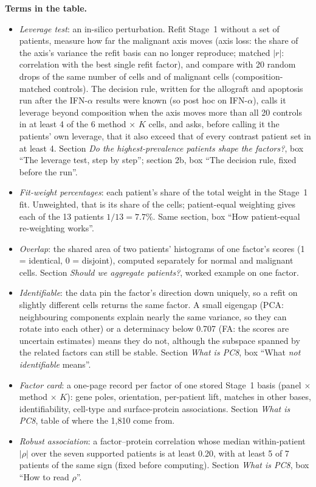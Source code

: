 {\footnotesize
\textbf{Terms in the table.}\par\nobreak
\begin{itemize}[leftmargin=1.6em,itemsep=1pt]
\item[a] \emph{Leverage test}: an in-silico perturbation. Refit Stage~1 without a set of patients, measure how far the malignant axis moves (axis loss: the share of the axis's variance the refit basis can no longer reproduce; matched $|r|$: correlation with the best single refit factor), and compare with 20 random drops of the same number of cells and of malignant cells (composition-matched controls). The decision rule, written for the allograft and apoptosis run after the IFN-$\alpha$ results were known (so post hoc on IFN-$\alpha$), calls it leverage beyond composition when the axis moves more than all 20 controls in at least 4 of the 6 method $\times$ $K$ cells, and asks, before calling it the patients' own leverage, that it also exceed that of every contrast patient set in at least 4. Section \emph{Do the highest-prevalence patients shape the factors?}, box ``The leverage test, step by step''; section 2b, box ``The decision rule, fixed before the run''.
\item[b] \emph{Fit-weight percentages}: each patient's share of the total weight in the Stage~1 fit. Unweighted, that is its share of the cells; patient-equal weighting gives each of the 13 patients $1/13 = 7.7\%$. Same section, box ``How patient-equal re-weighting works''.
\item[c] \emph{Overlap}: the shared area of two patients' histograms of one factor's scores (1 = identical, 0 = disjoint), computed separately for normal and malignant cells. Section \emph{Should we aggregate patients?}, worked example on one factor.
\item[d] \emph{Identifiable}: the data pin the factor's direction down uniquely, so a refit on slightly different cells returns the same factor. A small eigengap (PCA: neighbouring components explain nearly the same variance, so they can rotate into each other) or a determinacy below 0.707 (FA: the scores are uncertain estimates) means they do not, although the subspace spanned by the related factors can still be stable. Section \emph{What is PC8}, box ``What \emph{not identifiable} means''.
\item[e] \emph{Factor card}: a one-page record per factor of one stored Stage~1 basis (panel $\times$ method $\times$ $K$): gene poles, orientation, per-patient lift, matches in other bases, identifiability, cell-type and surface-protein associations. Section \emph{What is PC8}, table of where the 1,810 come from.
\item[f] \emph{Robust association}: a factor--protein correlation whose median within-patient $|\rho|$ over the seven supported patients is at least 0.20, with at least 5 of 7 patients of the same sign (fixed before computing). Section \emph{What is PC8}, box ``How to read $\rho$''.
\end{itemize}
\par}


